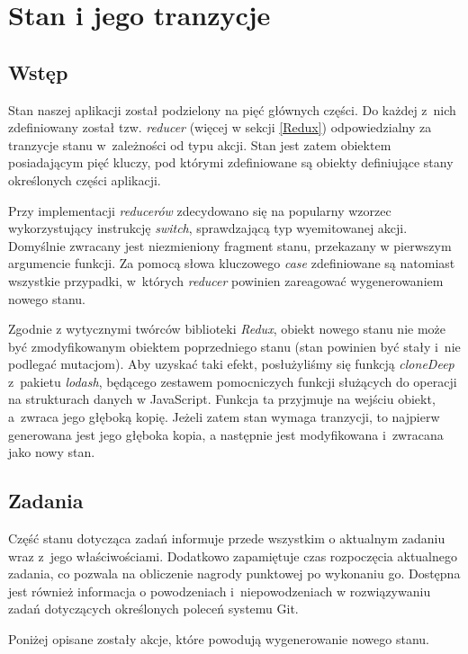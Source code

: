 \documentclass[12pt,a4paper,polish,thesis]{dcsbook}
\begin{document}
{	\section{Stan i jego tranzycje}
	
	\subsection{Wstęp}
	
	Stan naszej aplikacji został podzielony na pięć głównych części. Do każdej z~nich zdefiniowany został tzw. \textit{reducer} (więcej w sekcji \ref{Redux}) odpowiedzialny za tranzycje stanu w~zależności od typu akcji. Stan jest zatem obiektem posiadającym pięć kluczy, pod którymi zdefiniowane są obiekty definiujące stany określonych części aplikacji.
	
	Przy implementacji \textit{reducerów} zdecydowano się na popularny wzorzec wykorzystujący instrukcję \textit{switch}, sprawdzającą typ wyemitowanej akcji. Domyślnie zwracany jest niezmieniony fragment stanu, przekazany w pierwszym argumencie funkcji. Za pomocą słowa kluczowego \textit{case} zdefiniowane są natomiast wszystkie przypadki, w~których \textit{reducer} powinien zareagować wygenerowaniem nowego stanu.
	
	Zgodnie z wytycznymi twórców biblioteki \textit{Redux}, obiekt nowego stanu nie może być zmodyfikowanym obiektem poprzedniego stanu (stan powinien być stały i~nie podlegać mutacjom). Aby uzyskać taki efekt, posłużyliśmy się funkcją \textit{cloneDeep} z~pakietu \textit{lodash}, będącego zestawem pomocniczych funkcji służących do operacji na strukturach danych w JavaScript. Funkcja ta przyjmuje na wejściu obiekt, a~zwraca jego głęboką kopię. Jeżeli zatem stan wymaga tranzycji, to najpierw generowana jest jego głęboka kopia, a następnie jest modyfikowana i~zwracana jako nowy stan.
	
	\subsection{Zadania}
	
	Część stanu dotycząca zadań informuje przede wszystkim o aktualnym zadaniu wraz z~jego właściwościami. Dodatkowo zapamiętuje czas rozpoczęcia aktualnego zadania, co pozwala na obliczenie nagrody punktowej po wykonaniu go. Dostępna jest również informacja o powodzeniach i~niepowodzeniach w rozwiązywaniu zadań dotyczących określonych poleceń systemu Git.
	
	Poniżej opisane zostały akcje, które powodują wygenerowanie nowego stanu.
		
}
\end{document}

